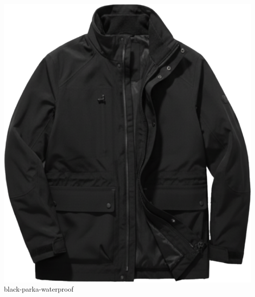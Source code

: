 \documentclass[10pt]{article}
\begin{document}
\begin{minipage}[t]{0.22\textwidth}\centering\vspace{0mm}
\includegraphics[width=\linewidth,keepaspectratio]{assets/jackets/black-parka-waterproof.png}\\
\vspace{0.5mm}\tiny black-parka-waterproof\end{minipage}
\newpage
\end{document}
